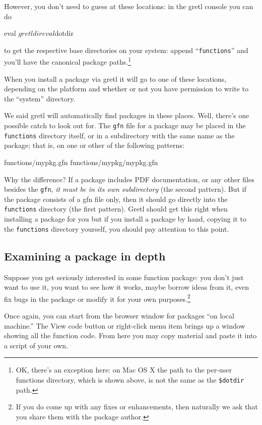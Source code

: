 \documentclass[oneside]{book}
\begin{document}
However, you don't need to guess at these locations: in the gretl
console you can do
%
\begin{code}
eval $gretldir
eval $dotdir
\end{code}
%
to get the respective base directories on your system: append
``\texttt{functions}'' and you'll have the canonical package
paths.\footnote{OK, there's an exception here: on Mac OS X the path to
  the per-user functions directory, which is shown above, is not the
  same as the \verb|$dotdir| path.}

When you install a package via gretl it will go to one of these
locations, depending on the platform and whether or not you have
permission to write to the ``system'' directory.

We said gretl will automatically find packages in these places. Well,
there's one possible catch to look out for. The \texttt{gfn} file for
a package may be placed in the \texttt{functions} directory itself, or
in a subdirectory with the same name as the package; that is, on one
or other of the following patterns:
%
\begin{code}
functions/mypkg.gfn
functions/mypkg/mypkg.gfn
\end{code}
%
Why the difference? If a package includes PDF documentation, or any
other files besides the \texttt{gfn}, \textit{it must be in its own
  subdirectory} (the second pattern). But if the package consists of a
gfn file only, then it should go directly into the \texttt{functions}
directory (the first pattern).  Gretl should get this right when
installing a package for you but if you install a package by hand,
copying it to the \texttt{functions} directory yourself, you should
pay attention to this point.

\subsection{Examining a package in depth}

Suppose you get seriously interested in some function package: you
don't just want to use it, you want to see how it works, maybe borrow
ideas from it, even fix bugs in the package or modify it for your own
purposes.\footnote{If you do come up with any fixes or enhancements,
  then naturally we ask that you share them with the package author.}

Once again, you can start from the browser window for packages ``on
local machine.'' The \textsf{View code} button or right-click menu
item brings up a window showing all the function code. From here
you may copy material and paste it into a script of your own.
\end{document}
